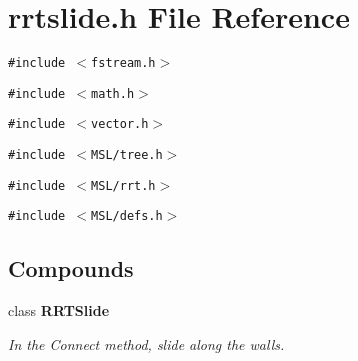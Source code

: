 \section{rrtslide.h File Reference}
\label{rrtslide_h}
{\tt \#include $<$fstream.h$>$}\par
{\tt \#include $<$math.h$>$}\par
{\tt \#include $<$vector.h$>$}\par
{\tt \#include $<$MSL/tree.h$>$}\par
{\tt \#include $<$MSL/rrt.h$>$}\par
{\tt \#include $<$MSL/defs.h$>$}\par
\subsection*{Compounds}
\begin{CompactItemize}
\item 
class {\bf RRTSlide}
\begin{CompactList}\small\item\em In the Connect method, slide along the walls.\item\end{CompactList}\end{CompactItemize}
